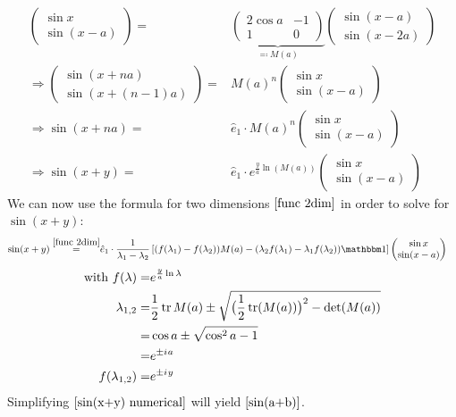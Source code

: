 \documentclass[12pt]{article}
\renewcommand{\i}{{i\mkern1mu}}
\begin{document}
\begin{align}
\begin{pmatrix} \sin x \\ \sin(x - a) \end{pmatrix} =& \underbrace{\begin{pmatrix} 2\cos a & -1 \\ 1 & 0 \end{pmatrix}}_{\eqqcolon M(a)} \begin{pmatrix} \sin (x-a) \\ \sin(x-2a) \end{pmatrix} \nonumber\\
\Rightarrow \begin{pmatrix} \sin (x+na) \\ \sin(x+(n-1)a) \end{pmatrix} =& M(a)^n \begin{pmatrix} \sin x \\ \sin(x-a) \end{pmatrix}\\
\Rightarrow \sin(x+na) =& \hat e_1 \cdot M(a)^n \begin{pmatrix} \sin x \\ \sin(x-a) \end{pmatrix}\\
\Rightarrow \sin(x+y) =& \hat e_1 \cdot e^{\frac ya \ln(M(a))} \begin{pmatrix} \sin x \\ \sin(x-a) \end{pmatrix}
\end{align}
We can now use the formula for two dimensions $\eqref{func 2dim}$ in order to solve for $\sin(x+y)$:
\begin{align}
\sin(x+y) \overset{\eqref{func 2dim}}=& \hat e_1 \cdot \frac 1{\lambda_1 - \lambda_2} \left[(f(\lambda_1) - f(\lambda_2))M(a) - (\lambda_2 f(\lambda_1) - \lambda_1 f(\lambda_2)) \mathbbm 1\right] \begin{pmatrix} \sin x \\ \sin(x-a) \end{pmatrix} \label{sin(x+y) numerical}
\end{align}
\begin{align*}
\text{with}\ f(\lambda) =& e^{\frac ya \ln\lambda}\\
\lambda_{1,2} =& \frac 12\tr M(a) \pm \sqrt{\big(\frac 12\tr (M(a))\big)^2 - \det(M(a))}\nonumber\\
=& \cos a \pm \sqrt{\cos^2 a - 1}\nonumber\\
=& e^{\pm \i a}\\
f(\lambda_{1,2}) =& e^{\pm \i y}
\end{align*}
Simplifying $\eqref{sin(x+y) numerical}$ will yield $\eqref{sin(a+b)}$.
\end{document}
